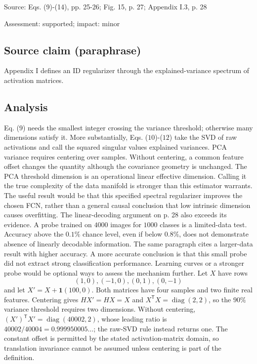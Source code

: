 \documentclass[11pt]{article}
\begin{document}
Source: Eqs. (9)-(14), pp. 25-26; Fig. 15, p. 27; Appendix I.3, p. 28

Assessment: supported; impact: minor

\subsection*{Source claim (paraphrase)}

Appendix I defines an ID regularizer through the explained-variance spectrum of activation matrices.

\subsection*{Analysis}

Eq. (\(9\)) needs the smallest integer crossing the variance threshold; otherwise many dimensions satisfy it. More substantially, Eqs. (\(10\))-(\(12\)) take the SVD of raw activations and call the squared singular values explained variances. PCA variance requires centering over samples. Without centering, a common feature offset changes the quantity although the covariance geometry is unchanged. The PCA threshold dimension is an operational linear effective dimension. Calling it the true complexity of the data manifold is stronger than this estimator warrants. The useful result would be that this specified spectral regularizer improves the chosen FCN, rather than a general causal conclusion that low intrinsic dimension causes overfitting. The linear-decoding argument on p. 28 also exceeds its evidence. A probe trained on \(4000\) images for \(1000\) classes is a limited-data test. Accuracy above the \(0.1\%\) chance level, even if below \(0.8\%\), does not demonstrate absence of linearly decodable information. The same paragraph cites a larger-data result with higher accuracy. A more accurate conclusion is that this small probe did not extract strong classification performance. Learning curves or a stronger probe would be optional ways to assess the mechanism further. Let \(X\) have rows \[(1,0),(-1,0),(0,1),(0,-1)\] and let \(X'=X+\mathbf1(100,0)\). Both matrices have four samples and two finite real features. Centering gives \(HX'=HX=X\) and \(X^{\mathsf T}X=\operatorname{diag}(2,2)\), so the \(90\%\) variance threshold requires two dimensions. Without centering, \((X')^{\mathsf T}X'=\operatorname{diag}(40002,2)\), whose leading ratio is \(40002/40004=0.999950005\ldots\); the raw-SVD rule instead returns one. The constant offset is permitted by the stated activation-matrix domain, so translation invariance cannot be assumed unless centering is part of the definition.
\end{document}
